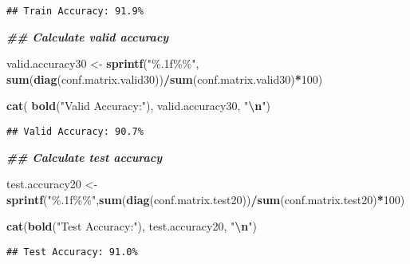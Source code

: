 \documentclass[
]{article}
\newenvironment{Shaded}{\begin{snugshade}}{\end{snugshade}}
\newcommand{\DecValTok}[1]{\textcolor[rgb]{0.00,0.00,0.81}{#1}}
\newcommand{\DocumentationTok}[1]{\textcolor[rgb]{0.56,0.35,0.01}{\textbf{\textit{#1}}}}
\newcommand{\FunctionTok}[1]{\textcolor[rgb]{0.13,0.29,0.53}{\textbf{#1}}}
\newcommand{\NormalTok}[1]{#1}
\newcommand{\OtherTok}[1]{\textcolor[rgb]{0.56,0.35,0.01}{#1}}
\newcommand{\SpecialCharTok}[1]{\textcolor[rgb]{0.81,0.36,0.00}{\textbf{#1}}}
\newcommand{\StringTok}[1]{\textcolor[rgb]{0.31,0.60,0.02}{#1}}
\begin{document}
\begin{verbatim}
## Train Accuracy: 91.9%
\end{verbatim}

\begin{Shaded}
\begin{Highlighting}[]
\DocumentationTok{\#\# Calculate valid accuracy}

\NormalTok{valid.accuracy30 }\OtherTok{\textless{}{-}} \FunctionTok{sprintf}\NormalTok{(}\StringTok{"\%.1f\%\%"}\NormalTok{, }\FunctionTok{sum}\NormalTok{(}\FunctionTok{diag}\NormalTok{(conf.matrix.valid30))}\SpecialCharTok{/}\FunctionTok{sum}\NormalTok{(conf.matrix.valid30)}\SpecialCharTok{*}\DecValTok{100}\NormalTok{)}

\FunctionTok{cat}\NormalTok{( }\FunctionTok{bold}\NormalTok{(}\StringTok{"Valid Accuracy:"}\NormalTok{), valid.accuracy30, }\StringTok{"}\SpecialCharTok{\textbackslash{}n}\StringTok{"}\NormalTok{)}
\end{Highlighting}
\end{Shaded}

\begin{verbatim}
## Valid Accuracy: 90.7%
\end{verbatim}

\begin{Shaded}
\begin{Highlighting}[]
\DocumentationTok{\#\# Calculate test accuracy}

\NormalTok{test.accuracy20 }\OtherTok{\textless{}{-}} \FunctionTok{sprintf}\NormalTok{(}\StringTok{"\%.1f\%\%"}\NormalTok{,}\FunctionTok{sum}\NormalTok{(}\FunctionTok{diag}\NormalTok{(conf.matrix.test20))}\SpecialCharTok{/}\FunctionTok{sum}\NormalTok{(conf.matrix.test20)}\SpecialCharTok{*}\DecValTok{100}\NormalTok{)}

\FunctionTok{cat}\NormalTok{(}\FunctionTok{bold}\NormalTok{(}\StringTok{"Test Accuracy:"}\NormalTok{), test.accuracy20, }\StringTok{"}\SpecialCharTok{\textbackslash{}n}\StringTok{"}\NormalTok{)}
\end{Highlighting}
\end{Shaded}

\begin{verbatim}
## Test Accuracy: 91.0%
\end{verbatim}
\end{document}
